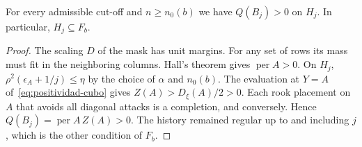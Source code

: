 \begin{lema}\label{lem:positividad-llegada}
For every admissible cut-off and \(n\ge n_0(b)\) we have \(Q(B_j)>0\) on \(H_j\). In particular,
\(H_j\subseteq F_b\).
\end{lema}
\begin{proof}
The scaling \(D\) of the mask has unit margins. For any set of rows its mass must fit in the neighboring
columns. Hall's theorem gives \(\operatorname{per}A>0\). On \(H_j\), \(\rho^2(\epsilon_A+1/j)\le\eta\) by
the choice of \(\alpha\) and \(n_0(b)\). The evaluation at \(Y=A\) of~\eqref{eq:positividad-cubo} gives
\(Z(A)>D_\xi(A)/2>0\). Each rook placement on \(A\) that avoids all diagonal attacks is a completion, and
conversely. Hence \(Q(B_j)=\operatorname{per}A\,Z(A)>0\). The history remained regular up to and
including \(j\), which is the other condition of \(F_b\).
\end{proof}
